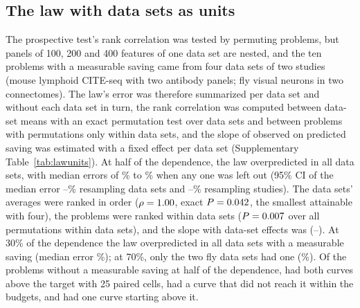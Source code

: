 \subsection*{The law with data sets as units}
The prospective test's rank correlation was tested by permuting problems, but panels of 100, 200 and 400 features of one data set are nested, and the ten problems with a measurable saving came from four data sets of two studies (mouse lymphoid CITE-seq with two antibody panels; fly visual neurons in two connectomes). The law's error was therefore summarized per data set and without each data set in turn, the rank correlation was computed between data-set means with an exact permutation test over data sets and between problems with permutations only within data sets, and the slope of observed on predicted saving was estimated with a fixed effect per data set (Supplementary Table~\ref{tab:lawunits}). At half of the dependence, the law overpredicted in all \RvLawHalfSets{} data sets, with median errors of \RvLawHalfLooMin\% to \RvLawHalfLooMax\% when any one was left out (95\% CI of the median error \RvLawHalfErrLo--\RvLawHalfErrHi\% resampling data sets and \RvLawHalfErrStLo--\RvLawHalfErrStHi\% resampling studies). The data sets' averages were ranked in order ($\rho=1.00$, exact $P=0.042$, the smallest attainable with four), the problems were ranked within data sets ($P=0.007$ over all \RvLawHalfWithinPerm{} permutations within data sets), and the slope with data-set effects was \RvLawHalfSlope{} (\RvLawHalfSlopeLo--\RvLawHalfSlopeHi). At 30\% of the dependence the law overpredicted in all \RvLawThreeSets{} data sets with a measurable saving (median error \RvLawThreeErr\%); at 70\%, only the two fly data sets had one (\RvLawSevenErr\%). Of the \RvLawHalfNonN{} problems without a measurable saving at half of the dependence, \RvLawHalfBelow{} had both curves above the target with 25 paired cells, \RvLawHalfNotReached{} had a curve that did not reach it within the budgets, and \RvLawHalfOneAbove{} had one curve starting above it.

\begin{table}[h]
\caption{\textbf{The law with data sets as units.} Per data set with a measurable saving: problems, median absolute error of the law ($2^{|\log_2(\text{observed}/\text{law})|}-1$), median ratio of the observed to the predicted saving, and the median error over the other data sets. All: the median error with 95\% intervals from resampling data sets and, in the same parentheses, studies. Then the rank correlation of data-set means with its exact permutation $P$ value, the problem-level rank correlation with permutations within data sets, the slope of $\log$ observed on $\log$ predicted saving with a fixed effect per data set (95\% interval from resampling data sets), and the problems without a measurable saving by reason.}
\label{tab:lawunits}
\centering\footnotesize

\end{table}

